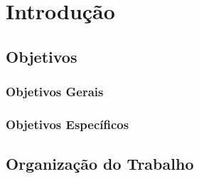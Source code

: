 \chapter{Introdução}

\section{Objetivos}

\subsection{Objetivos Gerais}

\subsection{Objetivos Específicos}

\section{Organização do Trabalho}
